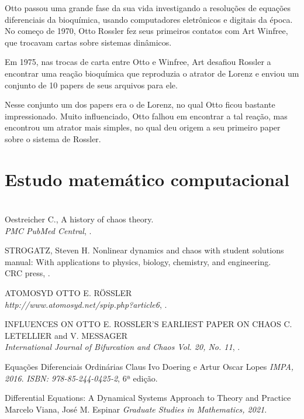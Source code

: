 \documentclass[12pt,a4paper]{article} %
\theoremstyle{definition}
\numberwithin{equation}{ex}
\theoremstyle{definition}
\begin{document}
	Otto passou uma grande fase da sua vida investigando a resoluções de equações diferenciais da bioquímica, usando computadores eletrônicos e digitais da época. No começo de 1970, Otto Rossler fez seus primeiros contatos com Art Winfree, que trocavam cartas sobre sistemas dinâmicos.

	Em 1975, nas trocas de carta entre Otto e Winfree, Art desafiou Rossler a encontrar uma reação bioquímica que reproduzia o atrator de Lorenz e enviou um conjunto de 10 papers de seus arquivos para ele.
			
	Nesse conjunto um dos papers era o de Lorenz, no qual Otto ficou bastante impressionado. Muito influenciado, Otto falhou em encontrar a tal reação, mas encontrou um atrator mais simples, no qual deu origem a seu primeiro paper sobre o sistema de Rossler.


\section{Estudo matemático computacional}



\section{} 
	\begin{thebibliography}{3}
		Oestreicher C.,
		\newblock A history of chaos theory.
		\newblock \\ \emph{PMC PubMed Central},
		.
		
		\beamertemplatearticlebibitems
		STROGATZ, Steven H. 
		\newblock Nonlinear dynamics and chaos with student solutions manual: With applications to physics, biology, chemistry, and engineering.
		\newblock \\ {CRC press},
		.
		
		\bibitem{}
		ATOMOSYD
		\newblock OTTO E. RÖSSLER
		\newblock \\ 
		\emph{http://www.atomosyd.net/spip.php?article6},
		.
		
		INFLUENCES ON OTTO E. ROSSLER’S EARLIEST PAPER ON CHAOS
		\newblock C. LETELLIER and V. MESSAGER
		\newblock \\ \emph{International Journal of Bifurcation and Chaos Vol. 20, No. 11},
		.
		
		Equações Diferenciais Ordinárias
		\newblock Claus Ivo Doering e Artur Oscar Lopes
		\newblock \emph{IMPA, 2016}.
		\newblock \emph{ISBN: 978-85-244-0425-2}, 6ª edição.
		
		Differential Equations: A Dynamical Systems Approach to Theory and Practice
		\newblock Marcelo Viana, José M. Espinar
		\newblock \emph{Graduate Studies in Mathematics, 2021}.
	\end{thebibliography}
\end{document}
